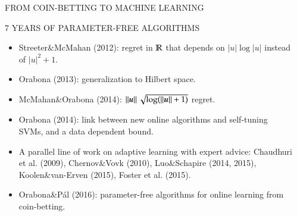 \documentclass[final,t,serif,mathserif]{beamer}
\def\blockspacea{\vspace{0.02cm}}
\begin{document}
\begin{frame}{}
\begin{columns}[t]
\begin{column}{.33\linewidth}
\begin{block}{FROM COIN-BETTING TO MACHINE LEARNING}
    \blockspacea
    \end{block}

    \begin{block}{7 YEARS OF PARAMETER-FREE ALGORITHMS}
    \blockspacea
    
    \begin{itemize}
    \item Streeter\&McMahan (2012): regret in $\mathbb{R}$ that depends on $|u| \log|u|$ instead of $|u|^2+1$.
    \item Orabona (2013): generalization to Hilbert space.
    \item McMahan\&Orabona (2014): $\left\|{\boldsymbol{u}}\right\| \sqrt{\log(\left\|{\boldsymbol{u}}\right\|+1)}$ regret.
    \item Orabona (2014): link between new online algorithms and self-tuning SVMs, and a data dependent bound.
    \item A parallel line of work on adaptive learning with expert advice: Chaudhuri et al. (2009), Chernov\&Vovk (2010), Luo\&Schapire (2014, 2015), Koolen\&van-Erven (2015), Foster et al. (2015).
    \item Orabona\&P\'al (2016): parameter-free algorithms for online learning from coin-betting.
    \end{itemize}

    \blockspacea
    \end{block}


\end{column}


\begin{column}{.33\linewidth}


\end{column}
\end{columns}
\end{frame}
\end{document}
